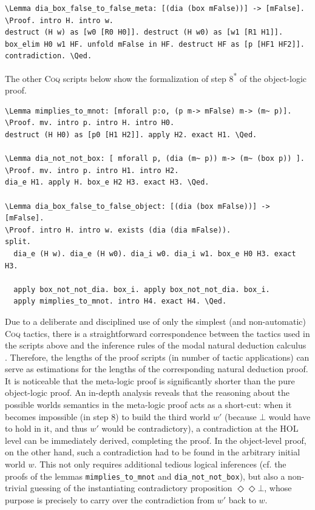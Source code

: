 \documentclass{llncs}
\newcommand{\red}[1]{\textcolor[rgb]{1,0,0}{#1}}
\newcommand{\blue}[1]{\textcolor[rgb]{0,0,1}{#1}}
\newcommand{\Lemma}{\red{Lemma}}
\newcommand{\Proof}{\blue{Proof}}
\newcommand{\Qed}{\blue{Qed}}
\newcommand{\verbsize}{\scriptsize}
\newcommand{\Dia}{\Diamond} %
\newcommand{\pos}{\Dia}
\begin{document}
\begin{Verbatim}[frame=single,commandchars=\\\{\},fontsize=\verbsize]
\Lemma dia_box_false_to_false_meta: [(dia (box mFalse))] -> [mFalse].
\Proof. intro H. intro w.
destruct (H w) as [w0 [R0 H0]]. destruct (H w0) as [w1 [R1 H1]].
box_elim H0 w1 HF. unfold mFalse in HF. destruct HF as [p [HF1 HF2]].
contradiction. \Qed.
\end{Verbatim}


\noindent
The other \textsc{Coq} scripts below show the formalization of step 8\textsuperscript{*} of the object-logic proof.

\begin{Verbatim}[frame=single,commandchars=\\\{\},fontsize=\verbsize]
\Lemma mimplies_to_mnot: [mforall p:o, (p m-> mFalse) m-> (m~ p)].
\Proof. mv. intro p. intro H. intro H0. 
destruct (H H0) as [p0 [H1 H2]]. apply H2. exact H1. \Qed.

\Lemma dia_not_not_box: [ mforall p, (dia (m~ p)) m-> (m~ (box p)) ].
\Proof. mv. intro p. intro H1. intro H2. 
dia_e H1. apply H. box_e H2 H3. exact H3. \Qed.

\Lemma dia_box_false_to_false_object: [(dia (box mFalse))] -> [mFalse].
\Proof. intro H. intro w. exists (dia (dia mFalse)).
split.
  dia_e (H w). dia_e (H w0). dia_i w0. dia_i w1. box_e H0 H3. exact H3.

  apply box_not_not_dia. box_i. apply box_not_not_dia. box_i.
  apply mimplies_to_mnot. intro H4. exact H4. \Qed.
\end{Verbatim}

\noindent
Due to a deliberate and disciplined use of only 
the simplest (and non-automatic) \textsc{Coq} tactics, 
there is a straightforward correspondence between the tactics used 
in the scripts above and the inference rules of the modal natural 
deduction calculus \cite{CSR}. Therefore, the lengths of the proof 
scripts (in number of tactic applications) can serve as estimations 
for the lengths of the corresponding natural deduction proof. 
It is noticeable that the meta-logic proof is significantly shorter 
than the pure object-logic proof. An in-depth analysis 
reveals that the reasoning about the possible worlds semantics in 
the meta-logic proof acts as a short-cut: when it becomes impossible (in step 8) to build the third world $w'$ (because $\bot$ would have to hold in it, and thus $w'$ would be contradictory), a contradiction at the HOL level can be immediately derived, completing the proof. In the object-level proof, on the other hand, such a contradiction had to be found in the arbitrary initial world $w$. This not only requires additional tedious logical inferences (cf. the proofs of the lemmas \texttt{mimplies\_to\_mnot} and \texttt{dia\_not\_not\_box}), but also a non-trivial guessing of the instantiating contradictory proposition $\pos \pos \bot$, whose purpose is precisely to carry over the contradiction from $w'$ back to $w$.
\end{document}

